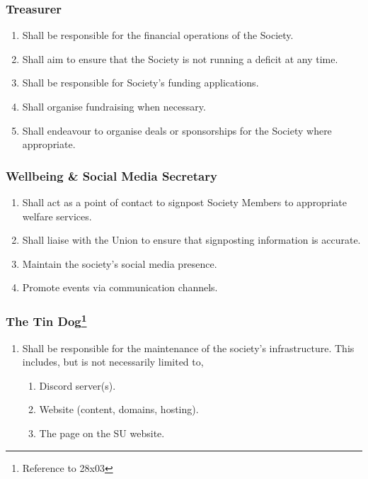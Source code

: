 \subsubsection{Treasurer}
\begin{enumerate}
    \item Shall be responsible for the financial operations of the Society.
    \item Shall aim to ensure that the Society is not running a deficit at any time.
    \item Shall be responsible for Society’s funding applications.
    \item Shall organise fundraising when necessary.
    \item Shall endeavour to organise deals or sponsorships for the Society where appropriate.
\end{enumerate}

\subsubsection{Wellbeing \& Social Media Secretary}
\begin{enumerate}
    \item Shall act as a point of contact to signpost Society Members to appropriate welfare services.
    \item Shall liaise with the Union to ensure that signposting information is accurate.
    \item Maintain the society’s social media presence.
    \item Promote events via communication channels.
\end{enumerate}

\subsubsection[The Tin Dog]{The Tin Dog\footnote{Reference to 28x03}}
\begin{enumerate}
    \item Shall be responsible for the maintenance of the society’s infrastructure. This includes, but is not necessarily limited to,
    \begin{enumerate}[a]
        \item Discord server(s).
        \item Website (content, domains, hosting).
        \item The page on the SU website.
    \end{enumerate}
\end{enumerate}

